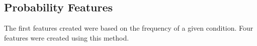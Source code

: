 \documentclass[sigconf]{acmart}
\begin{document}
\subsection{Probability Features}
The first features created were based on the frequency of a given condition.  Four features were created using this method.
\end{document}
